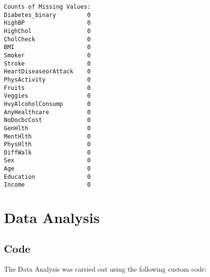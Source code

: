 \documentclass[11pt]{article}
\begin{document}
\begin{footnotesize}
\begin{Verbatim}[tabsize=4]
Counts of Missing Values:
Diabetes_binary         0
HighBP                  0
HighChol                0
CholCheck               0
BMI                     0
Smoker                  0
Stroke                  0
HeartDiseaseorAttack    0
PhysActivity            0
Fruits                  0
Veggies                 0
HvyAlcoholConsump       0
AnyHealthcare           0
NoDocbcCost             0
GenHlth                 0
MentHlth                0
PhysHlth                0
DiffWalk                0
Sex                     0
Age                     0
Education               0
Income                  0

\end{Verbatim}
\end{footnotesize}

\section*{Data Analysis} \subsection*{Code}The Data Analysis was carried out using the following custom code:
\end{document}
